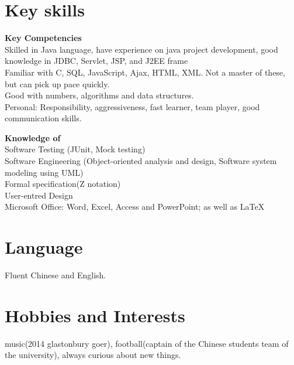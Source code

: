 \documentclass[margin]{res}
\begin{document}
\begin{resume}
\section{Key skills}
 {\bf  Key Competencies}\\
  Skilled in Java language, have experience on java project development, good
  knowledge in JDBC, Servlet, JSP, and J2EE frame\\  
  Familiar with C, SQL, JavaScript, Ajax, HTML, XML. Not a master
  of these, but can pick up pace quickly.\\
  Good with numbers, algorithms and data structures.\\
  Personal: Responsibility, aggressiveness, fast learner, team player, good
  communication skills.
  
   {\bf Knowledge of}\\
  Software Testing (JUnit, Mock testing)\\
  Software Engineering (Object-oriented analysis and design,
  Software system modeling using UML)\\
  Formal specification(Z notation)\\
  User-entred Design\\
  Microsoft Office: Word, Excel, Access and PowerPoint;
  as well as \LaTeX \\

\section{Language} Fluent Chinese and English.
\section{Hobbies and Interests}
music(2014 glastonbury goer), football(captain of the Chinese students team of
the university), always curious about new things.
\end{resume} 
\end{document}
